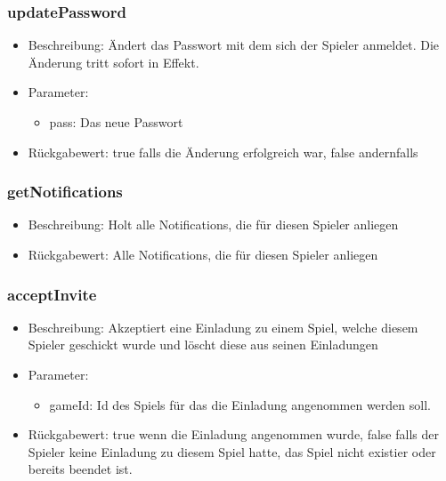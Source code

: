 \documentclass[a4paper]{scrreprt}
\begin{document}
    \subsubsection{updatePassword}
    \begin{itemize}
        \item Beschreibung: Ändert das Passwort mit dem sich der Spieler anmeldet. Die Änderung tritt sofort in Effekt.
        \item Parameter:
        \begin{itemize}
            \item pass: Das neue Passwort
        \end{itemize}
        \item Rückgabewert: true falls die Änderung erfolgreich war, false andernfalls 
    \end{itemize}
    \subsubsection{getNotifications}
    \begin{itemize}
        \item Beschreibung: Holt alle Notifications, die für diesen Spieler anliegen
        \item Rückgabewert:  Alle Notifications, die für diesen Spieler anliegen
    \end{itemize}
    \subsubsection{acceptInvite}
    \begin{itemize}
        \item Beschreibung: Akzeptiert eine Einladung zu einem Spiel, welche diesem Spieler geschickt wurde und löscht diese aus seinen Einladungen
        \item Parameter:
        \begin{itemize}
            \item gameId: Id des Spiels für das die Einladung angenommen werden soll.
        \end{itemize}
        \item Rückgabewert: true wenn die Einladung angenommen wurde, false falls der Spieler keine Einladung zu diesem Spiel hatte, das Spiel nicht existier oder bereits beendet ist. 
    \end{itemize}
\end{document}
